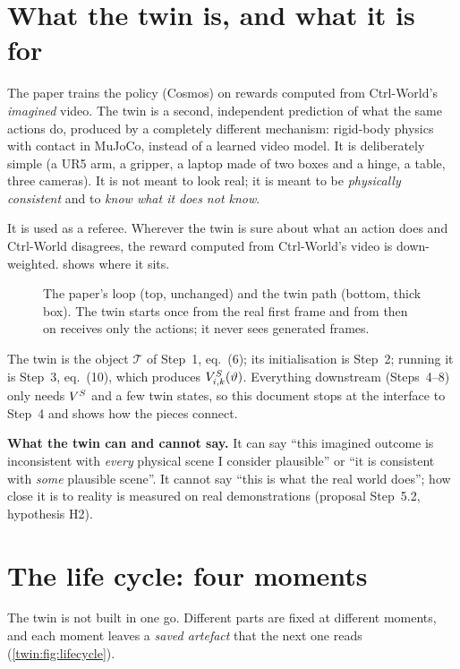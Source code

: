 \section{What the twin is, and what it is for}\label{twin:sec:what}
The paper trains the policy (Cosmos) on rewards computed from Ctrl-World's \emph{imagined} video. The twin is a second, independent prediction of what the same actions do, produced by a completely different mechanism: rigid-body physics with contact in MuJoCo, instead of a learned video model. It is deliberately simple (a UR5 arm, a gripper, a laptop made of two boxes and a hinge, a table, three cameras). It is not meant to look real; it is meant to be \emph{physically consistent} and to \emph{know what it does not know}.

It is used as a referee. Wherever the twin is sure about what an action does and Ctrl-World disagrees, the reward computed from Ctrl-World's video is down-weighted.  shows where it sits.

\begin{figure}[h]
\centering

\caption{The paper's loop (top, unchanged) and the twin path (bottom, thick box). The twin starts once from the real first frame and from then on receives only the actions; it never sees generated frames.}
\label{twin:fig:loop}
\end{figure}

\begin{inprop}
The twin is the object $\mathcal T$ of Step~1, eq.~(6); its initialisation is Step~2; running it is Step~3, eq.~(10), which produces $V^{S}_{i,k}(\vartheta)$. Everything downstream (Steps~4--8) only needs $V^{S}$ and a few twin states, so this document stops at the interface to Step~4 and shows how the pieces connect.
\end{inprop}

\textbf{What the twin can and cannot say.} It can say ``this imagined outcome is inconsistent with \emph{every} physical scene I consider plausible'' or ``it is consistent with \emph{some} plausible scene''. It cannot say ``this is what the real world does''; how close it is to reality is measured on real demonstrations (proposal Step~5.2, hypothesis H2).

\section{The life cycle: four moments}\label{twin:sec:lifecycle}
The twin is not built in one go. Different parts are fixed at different moments, and each moment leaves a \emph{saved artefact} that the next one reads (\cref{twin:fig:lifecycle}).

